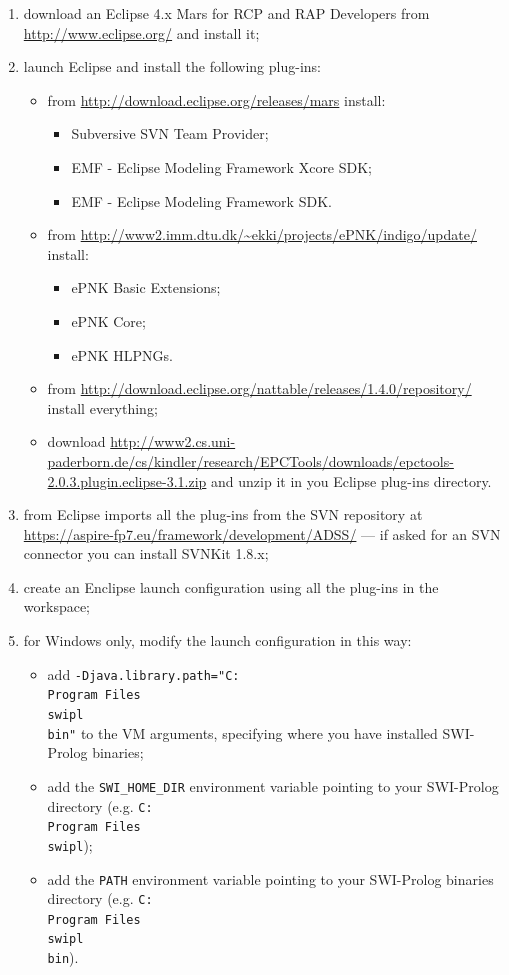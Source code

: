 \documentclass{memoir}
\begin{document}
	\begin{enumerate}
		\item download an Eclipse 4.x Mars for RCP and RAP Developers from \url{http://www.eclipse.org/} and install it;
		\item launch Eclipse and install the following plug-ins:
			\begin{itemize}
				\item from \url{http://download.eclipse.org/releases/mars} install:
				\begin{itemize}
					\item Subversive SVN Team Provider;
					\item EMF - Eclipse Modeling Framework Xcore SDK;
					\item EMF - Eclipse Modeling Framework SDK.
				\end{itemize}
				\item from \url{http://www2.imm.dtu.dk/~ekki/projects/ePNK/indigo/update/} install:
				\begin{itemize}
					\item ePNK Basic Extensions;
					\item ePNK Core;
					\item ePNK HLPNGs.
				\end{itemize}
				\item from \url{http://download.eclipse.org/nattable/releases/1.4.0/repository/} install everything;
				\item download \url{http://www2.cs.uni-paderborn.de/cs/kindler/research/EPCTools/downloads/epctools-2.0.3.plugin.eclipse-3.1.zip} and unzip it in you Eclipse plug-ins directory.
			\end{itemize}
		\item from Eclipse imports all the plug-ins from the SVN repository at \url{https://aspire-fp7.eu/framework/development/ADSS/} --- if asked for an SVN connector you can install SVNKit 1.8.x;
		\item create an Enclipse launch configuration using all the plug-ins in the workspace;
		\item for Windows only, modify the launch configuration in this way:
		\begin{itemize}
			\item add \texttt{-Djava.library.path="C:\\Program Files\\swipl\\bin"} to the VM arguments, specifying where you have installed SWI-Prolog binaries;
			\item add the \texttt{SWI\_HOME\_DIR} environment variable pointing to your SWI-Prolog directory (e.g. \texttt{C:\\Program Files\\swipl});
			\item add the \texttt{PATH} environment variable pointing to your SWI-Prolog binaries directory (e.g. \texttt{C:\\Program Files\\swipl\\bin}).
		\end{itemize}
	\end{enumerate}
	
\end{document}
